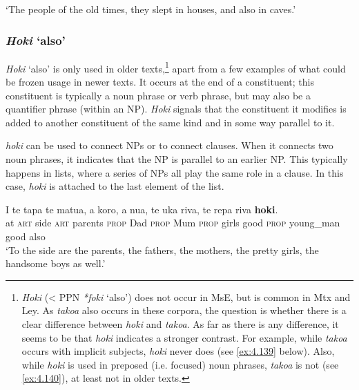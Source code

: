 \glt 
‘The people of the old times, they slept in houses, and also in caves.’ \textstyleExampleref{[Ley-5-02.001]}\textstyleExampleref{} 
\z {}
\subsubsection{\textit{Hoki} ‘also’}\label{sec:4.5.3.3}

\textit{Hoki} ‘also’ is only used in older texts,\footnote{\label{fn:196}\textit{Hoki} ({\textless} PPN \textit{*foki} ‘also’) does not occur in MsE, but is common in Mtx and Ley. As \textit{tako{\ꞌ}a} also occurs in these corpora, the question is whether there is a clear difference between \textit{hoki} and \textit{tako{\ꞌ}a}. As far as there is any difference, it seems to be that \textit{hoki} indicates a stronger contrast. For example, while \textit{tako{\ꞌ}a} occurs with implicit subjects, \textit{hoki} never does (see \ref{ex:4.139} below). Also, while \textit{hoki} is used in preposed (i.e. focused) noun phrases, \textit{tako{\ꞌ}a} is not (see \ref{ex:4.140}), at least not in older texts.} apart from a few examples of what could be frozen usage in newer texts. It occurs at the end of a constituent; this constituent is typically a noun phrase or verb phrase, but may also be a quantifier phrase (within an NP). \textit{Hoki} signals that the constituent it modifies is added to another constituent of the same kind and in some way parallel to it. 

\textit{hoki} can be used to connect NPs or to connect clauses. When it connects two noun phrases, it indicates that the NP is parallel to an earlier NP. This typically happens in lists, where a series of NPs all play the same role in a clause. In this case, \textit{hoki} is attached to the last element of the list. 

\ea\label{ex:4.138}
\gll {\ꞌ}I te tapa te matu{\ꞌ}a, a koro, a nua, te uka riva, te repa  riva \textbf{hoki}.\\
at \textsc{art} side \textsc{art} parents \textsc{prop} Dad \textsc{prop} Mum \textsc{prop} girls good \textsc{prop} young\_man  good also\\

\glt
‘To the side are the parents, the fathers, the mothers, the pretty girls, the handsome boys as well.’ \textstyleExampleref{[Ley-5-24.013]}
\z

